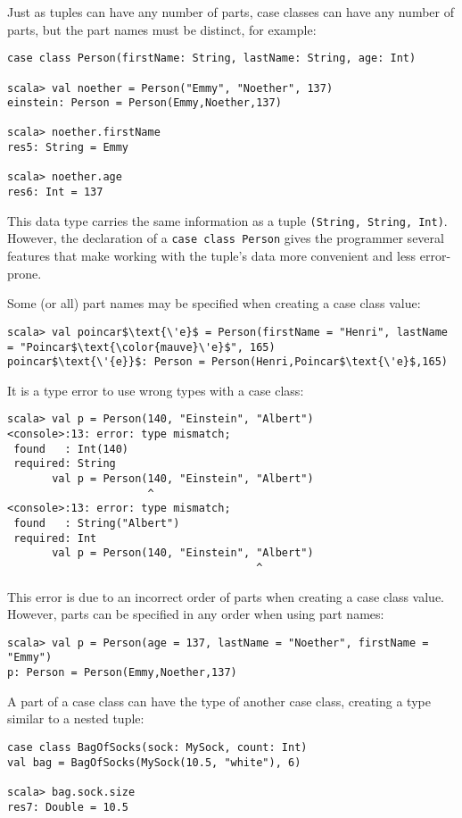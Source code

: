 Just as tuples can have any number of parts, case classes can have
any number of parts, but the part names must be distinct, for example:
\begin{lstlisting}
case class Person(firstName: String, lastName: String, age: Int)

scala> val noether = Person("Emmy", "Noether", 137)
einstein: Person = Person(Emmy,Noether,137)

scala> noether.firstName
res5: String = Emmy

scala> noether.age
res6: Int = 137
\end{lstlisting}
This data type carries the same information as a tuple \lstinline!(String, String, Int)!.
However, the declaration of a \lstinline!case class Person! gives
the programmer several features that make working with the tuple\textsf{'}s
data more convenient and less error-prone.

Some (or all) part names may be specified when creating a case class
value:
\begin{lstlisting}[extendedchars=true,mathescape=true]
scala> val poincar$\text{\'e}$ = Person(firstName = "Henri", lastName = "Poincar$\text{\color{mauve}\'e}$", 165)
poincar$\text{\'{e}}$: Person = Person(Henri,Poincar$\text{\'e}$,165)
\end{lstlisting}
It is a type error to use wrong types with a case class:
\begin{lstlisting}
scala> val p = Person(140, "Einstein", "Albert")
<console>:13: error: type mismatch;
 found   : Int(140)
 required: String
       val p = Person(140, "Einstein", "Albert")
                      ^
<console>:13: error: type mismatch;
 found   : String("Albert")
 required: Int
       val p = Person(140, "Einstein", "Albert")
                                       ^
\end{lstlisting}
This error is due to an incorrect order of parts when creating a case
class value. However, parts can be specified in any order when using
part names:
\begin{lstlisting}
scala> val p = Person(age = 137, lastName = "Noether", firstName = "Emmy")
p: Person = Person(Emmy,Noether,137)
\end{lstlisting}
A part of a case class can have the type of another case class, creating
a type similar to a nested tuple:
\begin{lstlisting}
case class BagOfSocks(sock: MySock, count: Int)
val bag = BagOfSocks(MySock(10.5, "white"), 6)

scala> bag.sock.size
res7: Double = 10.5
\end{lstlisting}



